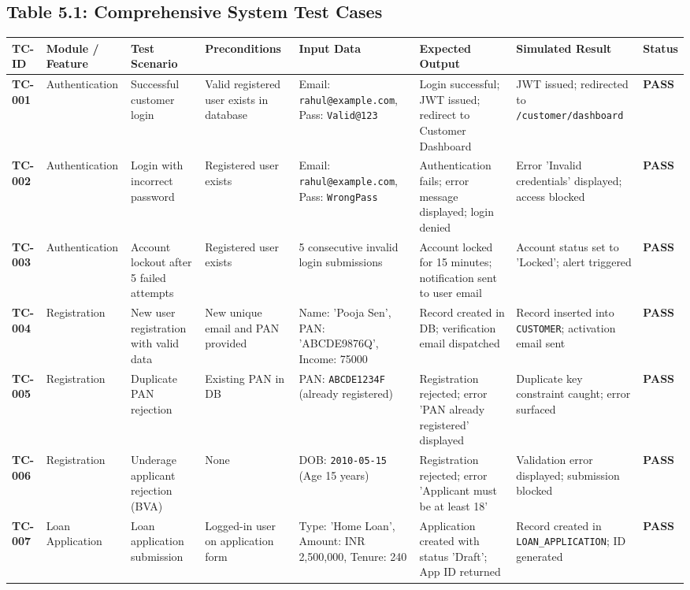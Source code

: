 \documentclass[12pt,a4paper,oneside]{report}
\begin{document}
\subsection{Table 5.1: Comprehensive System Test Cases}

\begin{table}[htbp]
\centering
\small
\begin{tabularx}{\textwidth}{p{2.5cm} X X X X X X X}
\toprule
\textbf{TC-ID} & \textbf{Module / Feature} & \textbf{Test Scenario} & \textbf{Preconditions} & \textbf{Input Data} & \textbf{Expected Output} & \textbf{Simulated Result} & \textbf{Status} \\
\midrule
\textbf{TC-001} & Authentication & Successful customer login & Valid registered user exists in database & Email: \texttt{rahul@example.com}, Pass: \texttt{Valid@123} & Login successful; JWT issued; redirect to Customer Dashboard & JWT issued; redirected to \texttt{/customer/dashboard} & \textbf{PASS} \\
\textbf{TC-002} & Authentication & Login with incorrect password & Registered user exists & Email: \texttt{rahul@example.com}, Pass: \texttt{WrongPass} & Authentication fails; error message displayed; login denied & Error 'Invalid credentials' displayed; access blocked & \textbf{PASS} \\
\textbf{TC-003} & Authentication & Account lockout after 5 failed attempts & Registered user exists & 5 consecutive invalid login submissions & Account locked for 15 minutes; notification sent to user email & Account status set to 'Locked'; alert triggered & \textbf{PASS} \\
\textbf{TC-004} & Registration & New user registration with valid data & New unique email and PAN provided & Name: 'Pooja Sen', PAN: 'ABCDE9876Q', Income: 75000 & Record created in DB; verification email dispatched & Record inserted into \texttt{CUSTOMER}; activation email sent & \textbf{PASS} \\
\textbf{TC-005} & Registration & Duplicate PAN rejection & Existing PAN in DB & PAN: \texttt{ABCDE1234F} (already registered) & Registration rejected; error 'PAN already registered' displayed & Duplicate key constraint caught; error surfaced & \textbf{PASS} \\
\textbf{TC-006} & Registration & Underage applicant rejection (BVA) & None & DOB: \texttt{2010-05-15} (Age 15 years) & Registration rejected; error 'Applicant must be at least 18' & Validation error displayed; submission blocked & \textbf{PASS} \\
\textbf{TC-007} & Loan Application & Loan application submission & Logged-in user on application form & Type: 'Home Loan', Amount: INR 2,500,000, Tenure: 240 & Application created with status 'Draft'; App ID returned & Record created in \texttt{LOAN\_APPLICATION}; ID generated & \textbf{PASS} \\

\end{tabularx}
\end{table}
\end{document}
